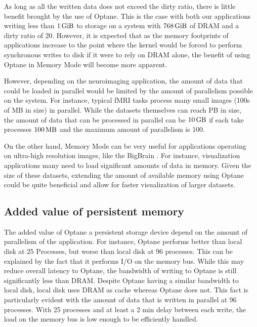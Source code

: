 \documentclass[conference]{IEEEtran}
\newcommand{\bigbrain}{BigBrain }
\begin{document}
As long as all the written data does not exceed the dirty ratio, there is little 
benefit brought by the use of Optane. This is the case with both
our applications writing less than $\SI{1}{\gibi\byte}$ to storage on a system with 
$\SI{768}{\gibi\byte}$ of DRAM and a dirty ratio of 20. However, it is expected 
that as the memory footprints of applications increase to the point where the kernel
would be forced to perform synchronous writes to disk if it were to rely on DRAM alone,
the benefit of using Optane in Memory Mode will become more apparent. 

However, depending on the neuroimaging application, the amount of data that could be
loaded in parallel would be limited by the amount of parallelism possible on the system.
For instance, typical fMRI tasks process many small images (100s of MB in size) in parallel.
While the datasets themselves can reach PB in size, the amount of data that can be processed in
parallel can be $\SI{10}{\giga\byte}$ if each take processes $\SI{100}{\mega\byte}$ and the 
maximum amount of parallelism is 100. 

On the other hand, Memory Mode can be very useful for applications operating on
ultra-high resolution images, like the \bigbrain. For instance, visualization applications
many need to load significant amounts of data in memory. Given the size of these datasets, 
extending the amount of available memory using Optane could be quite beneficial and allow
for faster visualization of larger datasets.


\subsection{Added value of persistent memory}

The added value of Optane a persistent storage device depend on the amount of parallelism
of the application. For instance, Optane performs better than local disk at 25 Processes,
but worse than local disk at 96 processes. This can be explained by the fact that it performs
I/O on the memory bus. While this may reduce overall latency to Optane, the bandwidth of 
writing to Optane is still significantly less than DRAM. Despite Optane having a similar bandwidth
to local disk, local disk uses DRAM as cache whereas Optane does not. This fact is 
particularly evident with the amount of data that is written in parallel at 96 processes. With 25 processes
and at least a 2 min
delay between each write, the load on the memory bus is low enough to be efficiently handled.
\end{document}
